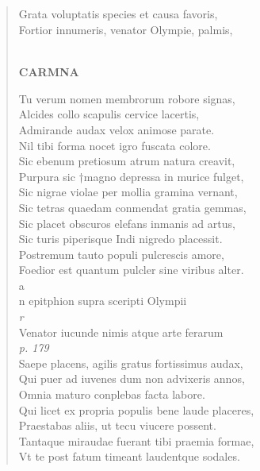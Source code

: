\documentclass[11pt, a4paper]{report}
\begin{document}
            \subsection*{}
      \begin{verse}
      Grata voluptatis species et causa favoris, \\ Fortior innumeris, venator Olympie, palmis, \\ 
        ﻿\pagebreak 
    \begin{center} \textbf{CARMNA} \end{center} \marginpar{[278]} Tu verum nomen membrorum robore signas, \\ Alcides collo scapulis cervice lacertis, \\ Admirande audax velox animose parate. \\ Nil tibi forma nocet igro fuscata colore. \\ Sic ebenum pretiosum atrum natura creavit, \\ Purpura sic †magno depressa in murice fulget, \\ Sic nigrae violae per mollia gramina vernant, \\ Sic tetras quaedam conmendat gratia gemmas, \\ Sic placet obscuros elefans inmanis ad artus, \\ Sic turis piperisque Indi nigredo placessit. \\ Postremum tauto populi pulcrescis amore, \\ Foedior est quantum pulcler sine viribus alter. \\ a \\ n epitphion supra sceripti Olympii \\ \textit{r} \\ Venator iucunde nimis atque arte ferarum \\ \textit{p. 179} \\ Saepe placens, agilis gratus fortissimus audax, \\ Qui puer ad iuvenes dum non advixeris annos, \\ Omnia maturo conplebas facta labore. \\ Qui licet ex propria populis bene laude placeres, \\ Praestabas aliis, ut tecu viucere possent. \\ Tantaque miraudae fuerant tibi praemia formae, \\ Vt te post fatum timeant laudentque sodales. \\ 

\end{verse}
\end{document}
